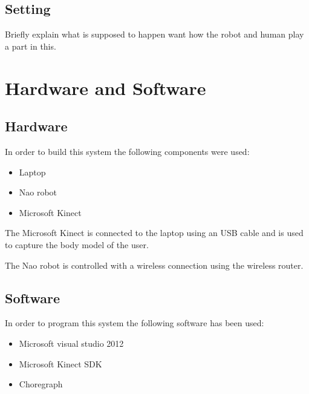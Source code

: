 \documentclass[10pt,a4paper,oneside]{scrartcl}
\begin{document}
\subsection{Setting}
Briefly explain what is supposed to happen want how the robot and human play a part in this.

\section{Hardware and Software}

\subsection{Hardware}
In order to build this system the following components were used:
\begin{itemize}
  \item Laptop
  \item Nao robot
  \item Microsoft Kinect
\end{itemize}

The Microsoft Kinect is connected to the laptop using an USB cable and is used to capture the body model of the user. 

The Nao robot is controlled with a wireless connection using the wireless router. 

\subsection{Software}
In order to program this system the following software has been used:
\begin{itemize}
  \item Microsoft visual studio 2012
  \item Microsoft Kinect SDK
  \item Choregraph
\end{itemize}


\end{document}
